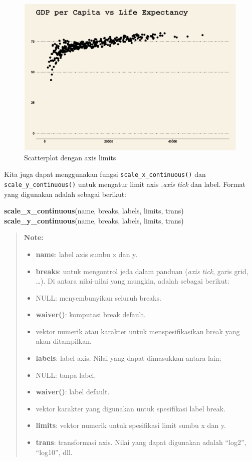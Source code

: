 \documentclass[]{book}
\newenvironment{Shaded}{\begin{snugshade}}{\end{snugshade}}
\newcommand{\KeywordTok}[1]{\textcolor[rgb]{0.13,0.29,0.53}{\textbf{#1}}}
\newcommand{\NormalTok}[1]{#1}
\begin{document}
\begin{figure}

{\centering \includegraphics[width=0.7\linewidth]{EnvStat_files/figure-latex/gglimits-1} 

}

\caption{Scatterplot dengan axis limits }\label{fig:gglimits}
\end{figure}

Kita juga dapat menggunakan fungsi \texttt{scale\_x\_continuous()} dan
\texttt{scale\_y\_continuous()} untuk mengatur limit axis ,\emph{axis
tick} dan label. Format yang digunakan adalah sebagai berikut:

\begin{Shaded}
\begin{Highlighting}[]
\KeywordTok{scale_x_continuous}\NormalTok{(name, breaks, labels, limits, trans)}
\KeywordTok{scale_y_continuous}\NormalTok{(name, breaks, labels, limits, trans)}
\end{Highlighting}
\end{Shaded}

\begin{quote}
\textbf{Note: }

\begin{itemize}
\item
  \textbf{name}: label axis sumbu x dan y.
\item
  \textbf{breaks}: untuk mengontrol jeda dalam panduan (\emph{axis
  tick}, garis grid, \ldots{}). Di antara nilai-nilai yang mungkin,
  adalah sebagai berikut:
\item
  NULL: menyembunyikan seluruh breaks.
\item
  \textbf{waiver()}: komputasi break default.
\item
  vektor numerik atau karakter untuk menspesifikasikan break yang akan
  ditampilkan.
\item
  \textbf{labels}: label axis. Nilai yang dapat dimasukkan antara lain;
\item
  NULL: tanpa label.
\item
  \textbf{waiver()}: label default.
\item
  vektor karakter yang digunakan untuk spesifikasi label break.
\item
  \textbf{limits}: vektor numerik untuk spesifikasi limit sumbu x dan y.
\item
  \textbf{trans}: transformasi axis. Nilai yang dapat digunakan adalah
  ``log2'', ``log10'', dll.
\end{itemize}
\end{quote}
\end{document}
